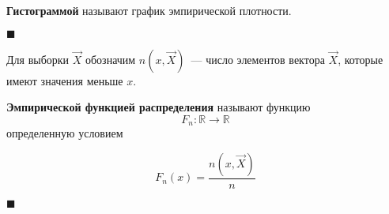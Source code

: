 \textbf{Гистограммой} называют график эмпирической плотности.

$\blacksquare{}$

Для выборки $\overrightarrow X$ обозначим $n(x, \overrightarrow X)$~--- число элементов вектора $\overrightarrow X$, которые имеют значения меньше $x$.

\textbf{Эмпирической функцией распределения} называют функцию
\begin{equation*}
    F_n : \mathbb{R} \to \mathbb{R}
\end{equation*}
определенную условием

\begin{equation*}
    F_n(x) = \frac{n(x, \overrightarrow X)}{n}
\end{equation*}

$\blacksquare{}$

